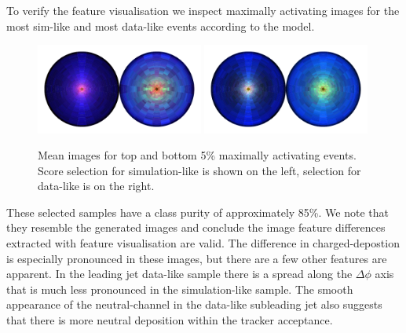 To verify the feature visualisation we inspect maximally activating images for the most sim-like and most data-like events according to the model. 
\begin{figure}[h!]
    \begin{center}
        \includegraphics[width=0.49\textwidth]{figures/event_selection/zee_max_act_mean_sim.pdf}
        \includegraphics[width=0.49\textwidth]{figures/event_selection/zee_max_act_mean_data.pdf}
    \end{center}
    \caption{Mean images for top and bottom 5\% maximally activating events. 
             Score selection for simulation-like is shown on the left, selection for data-like is on the right.}
    \label{fig:event_categorisation:zee_data_sim_max_act}
\end{figure}

These selected samples have a class purity of approximately 85\%.
We note that they resemble the generated images and conclude the image feature differences extracted with feature visualisation are valid. 
The difference in charged-\pt depostion is especially pronounced in these images, but there are a few other features are apparent. In the leading jet data-like sample there is a spread along the $\Delta\phi$ axis that is much less pronounced in the simulation-like sample. 
The smooth appearance of the neutral-\pt channel in the data-like subleading jet also suggests that there is more neutral deposition within the tracker acceptance. 



